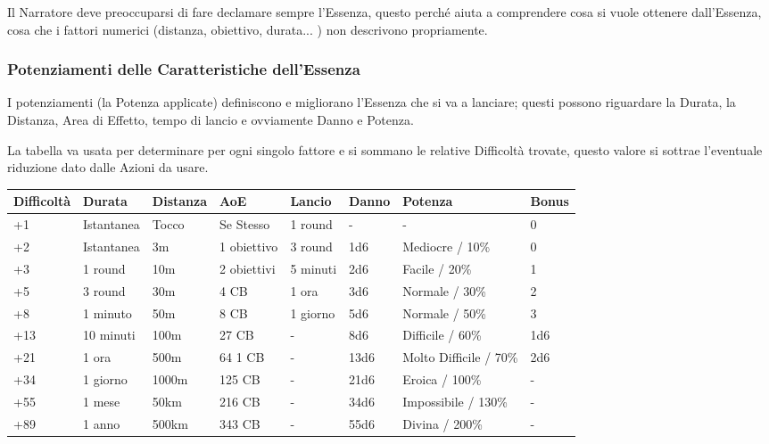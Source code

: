 \documentclass[a4paper,twoside,openany]{book}
\begin{document}
\begin{multicols}{2}
Il Narratore deve preoccuparsi di fare declamare sempre l'Essenza, questo perché aiuta a comprendere cosa si vuole ottenere dall'Essenza, cosa che i fattori numerici (distanza, obiettivo, durata... ) non descrivono propriamente.

\subsubsection{Potenziamenti delle Caratteristiche dell'Essenza}

\label{potenziamenti-delle-caratteristiche-dellessenza}

I potenziamenti (la Potenza applicate) definiscono e migliorano l'Essenza che si va a lanciare; questi possono riguardare la Durata, la Distanza, Area di Effetto, tempo di lancio e ovviamente Danno e Potenza.

La tabella va usata per determinare per ogni singolo fattore e si sommano le relative Difficoltà trovate, questo valore si sottrae l'eventuale riduzione dato dalle Azioni da usare.

\end{multicols}

\bigskip  %

\begin{tabularx}{0.98\textwidth}{llllllll}
\hline
\textbf{Difficoltà} &\textbf{Durata} &\textbf{Distanza} &\textbf{AoE} &\textbf{Lancio} & \textbf{Danno} & \textbf{Potenza} & \textbf{Bonus}\\
\hline
+1	&	Istantanea		& Tocco	& Se Stesso		& 1 round	& - 	& - 		& 0\\
\hline
+2	&	Istantanea 		& 3m	& 1 obiettivo	& 3 round 	& 1d6	& Mediocre / 10\%	& 0\\
\hline
+3	&	1 round			& 10m	& 2 obiettivi	& 5 minuti 	& 2d6	& Facile / 20\%	& 1\\
\hline
+5	&	3 round			& 30m	& 4 CB			& 1 ora 	& 3d6	& Normale / 30\%	& 2\\
\hline
+8	&	1 minuto		& 50m	& 8 CB			& 1 giorno 	& 5d6	& Normale / 50\%	& 3\\
\hline
+13	&	10 minuti		& 100m	& 27 CB			& -			& 8d6	& Difficile / 60\%	& 1d6\\
\hline 
+21	&	1 ora			& 500m	& 64 1 CB		& -			& 13d6	& Molto Difficile / 70\%& 2d6\\
\hline
+34	&	1 giorno		& 1000m & 125 CB		& - 		& 21d6	& Eroica / 100\%	& -\\
\hline
+55	&	1 mese			& 50km	& 216 CB		& - 		& 34d6	& Impossibile / 130\%& -\\
\hline
+89 &	1 anno			& 500km	& 343 CB		& - 		& 55d6	& Divina / 200\%	& -\\
\hline
\end{tabularx}
\bigskip
\end{document}
